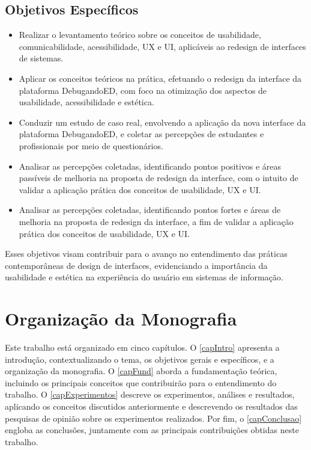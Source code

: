 \subsection{Objetivos Específicos}
\begin{itemize}
    \item Realizar o levantamento teórico sobre os conceitos de usabilidade, comunicabilidade, acessibilidade, \ac{UX} e \ac{UI}, aplicáveis ao redesign de interfaces de sistemas.
    \item Aplicar os conceitos teóricos na prática, efetuando o redesign da interface da plataforma DebugandoED, com foco na otimização dos aspectos de usabilidade, acessibilidade e estética.
    \item Conduzir um estudo de caso real, envolvendo a aplicação da nova interface da plataforma DebugandoED, e coletar as percepções de estudantes e profissionais por meio de questionários.
    \item Analisar as percepções coletadas, identificando pontos positivos e áreas passíveis de melhoria na proposta de redesign da interface, com o intuito de validar a aplicação prática dos conceitos de usabilidade, \ac{UX} e \ac{UI}.
    \item Analisar as percepções coletadas, identificando pontos fortes e áreas de melhoria na proposta de redesign da interface, a fim de validar a aplicação prática dos conceitos de usabilidade, \ac{UX} e \ac{UI}.

\end{itemize}

Esses objetivos visam contribuir para o avanço no entendimento das práticas contemporâneas de design de interfaces, evidenciando a importância da usabilidade e estética na experiência do usuário em sistemas de informação.

\section{Organização da Monografia}

Este trabalho está organizado em cinco capítulos. O \autoref{capIntro} apresenta a introdução, contextualizando o tema, os objetivos gerais e específicos, e a organização da monografia. O \autoref{capFund} aborda a fundamentação teórica, incluindo os principais conceitos que contribuirão para o entendimento do trabalho. O \autoref{capExperimentos} descreve os experimentos, análises e resultados, aplicando os conceitos discutidos anteriormente e descrevendo os resultados das pesquisas de opinião sobre os experimentos realizados. Por fim, o \autoref{capConclusao} engloba as conclusões, juntamente com as principais contribuições obtidas neste trabalho.

